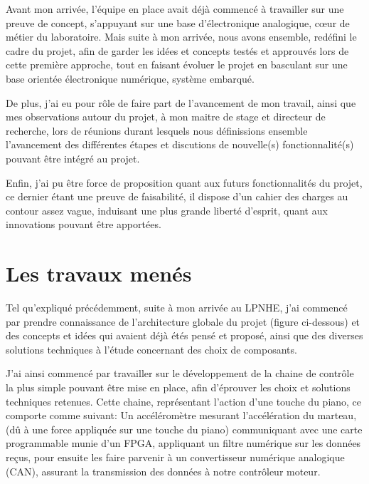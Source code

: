 \documentclass[french,a4paper,12pt]{report}
\begin{document}
	Avant mon arrivée, l'équipe en place avait déjà commencé à travailler sur une preuve de concept, s'appuyant sur une base d'électronique analogique, cœur de métier du laboratoire. Mais suite à mon arrivée, nous avons ensemble, redéfini le cadre du projet, afin de garder les idées et concepts testés et approuvés lors de cette première approche, tout en faisant évoluer le projet en basculant sur une base orientée électronique numérique, système embarqué.
	
	De plus, j'ai eu pour rôle de faire part de l'avancement de mon travail, ainsi que mes observations autour du projet, à mon maitre de stage et directeur de recherche, lors de réunions durant lesquels nous définissions ensemble l'avancement des différentes étapes et discutions de nouvelle(s) fonctionnalité(s) pouvant être intégré au projet.
	
	Enfin, j'ai pu être force de proposition quant aux futurs fonctionnalités du projet, ce dernier étant une preuve de faisabilité, il dispose d'un cahier des charges au contour assez vague, induisant une plus grande liberté d'esprit, quant aux innovations pouvant être apportées.	
	
	
	\chapter{Les travaux menés}
	
	Tel qu'expliqué précédemment, suite à mon arrivée au LPNHE, j'ai commencé par prendre connaissance de l'architecture globale du projet (figure ci-dessous) et des concepts et idées qui avaient déjà étés pensé et proposé, ainsi que des diverses solutions techniques à l'étude concernant des choix de composants.
	
	J'ai ainsi commencé par travailler sur le développement de la chaine de contrôle la plus simple pouvant être mise en place, afin d'éprouver les choix et solutions techniques retenues.
	Cette chaine, représentant l'action d'une touche du piano, ce comporte comme suivant: Un accéléromètre mesurant l'accélération du marteau, (dû à une force appliquée sur une touche du piano) communiquant avec une carte programmable munie d'un FPGA, appliquant un filtre numérique sur les données reçus, pour ensuite les faire parvenir à un convertisseur numérique analogique (CAN), assurant la transmission des données à notre contrôleur moteur.\newline
	
\end{document}
